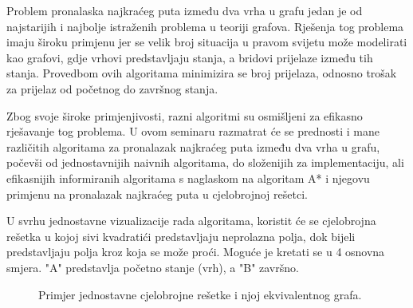 Problem pronalaska najkraćeg puta između dva vrha u grafu jedan je od najstarijih i najbolje istraženih problema u teoriji grafova. Rješenja tog problema imaju široku primjenu jer se velik broj situacija u pravom svijetu može modelirati kao grafovi, gdje vrhovi predstavljaju stanja, a bridovi prijelaze između tih stanja. Provedbom ovih algoritama minimizira se broj prijelaza, odnosno trošak za prijelaz od početnog do završnog stanja.

Zbog svoje široke primjenjivosti, razni algoritmi su osmišljeni za efikasno rješavanje tog problema. U ovom seminaru razmatrat će se prednosti i mane različitih algoritama za pronalazak najkraćeg puta između dva vrha u grafu, počevši od jednostavnijih naivnih algoritama,  do složenijih za implementaciju, ali efikasnijih informiranih algoritama s naglaskom na algoritam A* i njegovu primjenu na pronalazak najkraćeg puta u cjelobrojnoj rešetci. 

U svrhu jednostavne vizualizacije rada algoritama, koristit će se cjelobrojna rešetka u kojoj sivi kvadratići predstavljaju neprolazna polja, dok bijeli predstavljaju polja kroz koja se može proći. Moguće je kretati se u 4 osnovna smjera. "A" predstavlja početno stanje (vrh), a "B" završno. 

\begin{figure}[h]
	\centering
	
	\caption{Primjer jednostavne cjelobrojne rešetke i njoj ekvivalentnog grafa.} 
\end{figure}







